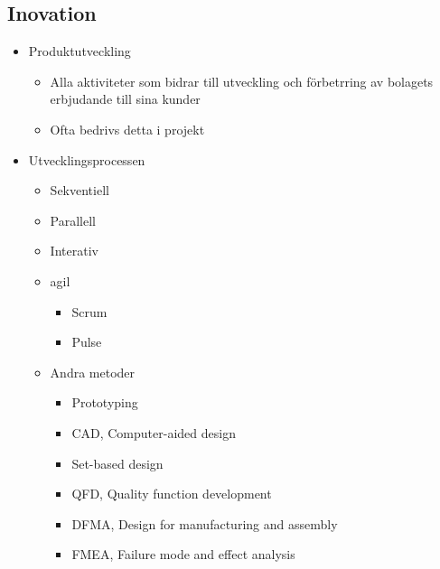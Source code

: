 \documentclass{article}
\begin{document}
\subsection{Inovation}
\begin{itemize}
    \item Produktutveckling
    \begin{itemize}
        \item Alla aktiviteter som bidrar till utveckling och förbetrring av bolagets erbjudande till sina kunder
        \item Ofta bedrivs detta i projekt
    \end{itemize}
    \item Utvecklingsprocessen
    \begin{itemize}
        \item Sekventiell
        \item Parallell
        \item Interativ
        \item agil
        \begin{itemize}
            \item Scrum 
            \item Pulse
        \end{itemize}
        \item Andra metoder
        \begin{itemize}
            \item Prototyping
            \item CAD, Computer-aided design
            \item Set-based design
            \item QFD, Quality function development
            \item DFMA, Design for manufacturing and assembly
            \item FMEA, Failure mode and effect analysis 
        \end{itemize}
    \end{itemize}
\end{itemize}
\end{document}
